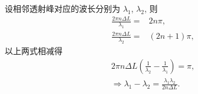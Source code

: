 \documentclass{assignment}
\begin{document}
\begin{sol}
    设相邻透射峰对应的波长分别为 $\lambda_1$, $\lambda_2$, 则
    \begin{align}
        \frac{2\pi n\Delta L}{\lambda_1}=&2n\pi,\\
        \frac{2\pi n\Delta L}{\lambda_2}=&(2n+1)\pi,
    \end{align}
    以上两式相减得
    \begin{gather}
        2\pi n\Delta L\left(\frac{1}{\lambda_2}-\frac{1}{\lambda_1}\right)=\pi,\\
        \Longrightarrow\lambda_1-\lambda_2=\frac{\lambda_1\lambda_2}{2n\Delta L}.
    \end{gather}
\end{sol}
\end{document}
